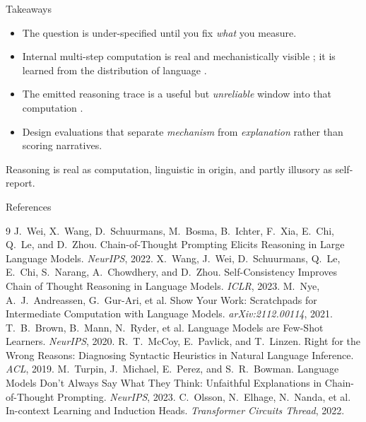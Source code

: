 \documentclass[aspectratio=169,11pt]{beamer}
\begin{document}
\begin{frame}{Takeaways}
  \begin{itemize}
    \item The question is under-specified until you fix \emph{what} you measure.
    \item Internal multi-step computation is real and mechanistically visible \citep{olsson2022incontext}; it is learned from the distribution of language \citep{brown2020language}.
    \item The emitted reasoning trace is a useful but \emph{unreliable} window into that computation \citep{turpin2023language}.
    \item Design evaluations that separate \emph{mechanism} from \emph{explanation} rather than scoring narratives.
  \end{itemize}
  \centering \alert{Reasoning is real as computation, linguistic in origin, and partly illusory as self-report.}
\end{frame}

\begin{frame}[allowframebreaks]{References}
  \footnotesize
  \begin{thebibliography}{9}
     J.~Wei, X.~Wang, D.~Schuurmans, M.~Bosma, B.~Ichter, F.~Xia, E.~Chi, Q.~Le, and D.~Zhou. Chain-of-Thought Prompting Elicits Reasoning in Large Language Models. \emph{NeurIPS}, 2022.
     X.~Wang, J.~Wei, D.~Schuurmans, Q.~Le, E.~Chi, S.~Narang, A.~Chowdhery, and D.~Zhou. Self-Consistency Improves Chain of Thought Reasoning in Language Models. \emph{ICLR}, 2023.
     M.~Nye, A.~J.~Andreassen, G.~Gur-Ari, et al. Show Your Work: Scratchpads for Intermediate Computation with Language Models. \emph{arXiv:2112.00114}, 2021.
     T.~B.~Brown, B.~Mann, N.~Ryder, et al. Language Models are Few-Shot Learners. \emph{NeurIPS}, 2020.
     R.~T.~McCoy, E.~Pavlick, and T.~Linzen. Right for the Wrong Reasons: Diagnosing Syntactic Heuristics in Natural Language Inference. \emph{ACL}, 2019.
     M.~Turpin, J.~Michael, E.~Perez, and S.~R.~Bowman. Language Models Don't Always Say What They Think: Unfaithful Explanations in Chain-of-Thought Prompting. \emph{NeurIPS}, 2023.
     C.~Olsson, N.~Elhage, N.~Nanda, et al. In-context Learning and Induction Heads. \emph{Transformer Circuits Thread}, 2022.
  \end{thebibliography}
\end{frame}
\end{document}
